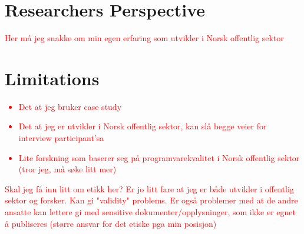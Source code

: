 \section{Researchers Perspective}
\textcolor{red}{Her må jeg snakke om min egen erfaring som utvikler i Norsk offentlig sektor}

\section{Limitations}
\textcolor{red}{\begin{itemize}
    \item Det at jeg bruker case study
    \item Det at jeg er utvikler i Norsk offentlig sektor, kan slå begge veier for interview participant'sa
    \item Lite forskning som baserer seg på programvarekvalitet i Norsk offentlig sektor (tror jeg, må søke litt mer)
\end{itemize}}

\textcolor{red}{Skal jeg få inn litt om etikk her? Er jo litt fare at jeg er både utvikler i offentlig sektor og forsker. Kan gi "validity" problems. Er også problemer med at de andre ansatte kan lettere gi med sensitive dokumenter/opplysninger, som ikke er egnet å publiseres (større ansvar for det etiske pga min posisjon)}
